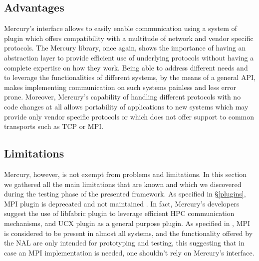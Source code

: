 \subsection{Advantages}
Mercury's interface allows to easily enable communication using a system of plugin which offers compatibility with a multitude of network and vendor specific protocols. The Mercury library, once again, shows the importance of having an abstraction layer to provide efficient use of underlying protocols without having a complete expertise on how they work. Being able to address different needs and to leverage the functionalities of different systems, by the means of a general API, makes implementing communication on such systems painless and less error prone. Moreover, Mercury's capability of handling different protocols with no code changes at all allows portability of applications to new systems which may provide only vendor specific protocols or which does not offer support to common transports such as TCP or MPI.

\subsection{Limitations}
\label{limitations}
Mercury, however, is not exempt from problems and limitations. In this section we gathered all the main limitations that are known and which we discovered during the testing phase of the presented framework. As specified in \S\ref{plugins}, MPI plugin is deprecated and not maintained \cite{git_mercury_mpi}. In fact, Mercury's developers suggest the use of libfabric plugin to leverage efficient HPC communication mechanisms, and UCX plugin as a general purpose plugin. As specified in \cite{nal_guide}, MPI is considered to be present in almost all systems, and the functionality offered by the NAL are only intended for prototyping and testing, this suggesting that in case an MPI implementation is needed, one shouldn't rely on Mercury's interface.\newline

